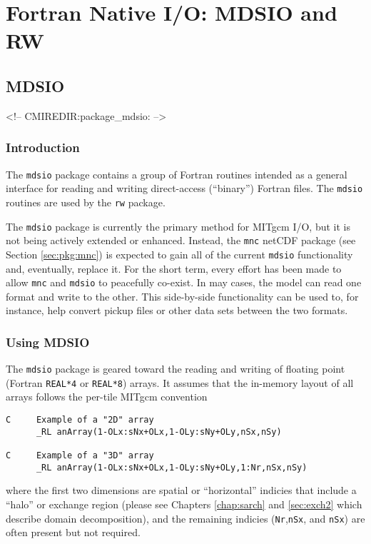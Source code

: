 

\section{Fortran Native I/O: MDSIO and RW}
\label{sec:mdsio_and_rw}


\subsection{MDSIO}
\label{sec:pkg:mdsio}
\begin{rawhtml}
<!-- CMIREDIR:package_mdsio: -->
\end{rawhtml}

\subsubsection{Introduction}
The \texttt{mdsio} package contains a group of Fortran routines
intended as a general interface for reading and writing direct-access
(``binary'') Fortran files.  The \texttt{mdsio} routines are used by
the \texttt{rw} package.

The \texttt{mdsio} package is currently the primary method for MITgcm
I/O, but it is not being actively extended or enhanced.  Instead, the
\texttt{mnc} netCDF package (see Section \ref{sec:pkg:mnc}) is
expected to gain all of the current \texttt{mdsio} functionality and,
eventually, replace it.  For the short term, every effort has been
made to allow \texttt{mnc} and \texttt{mdsio} to peacefully co-exist.
In may cases, the model can read one format and write to the other.
This side-by-side functionality can be used to, for instance, help
convert pickup files or other data sets between the two formats.


\subsubsection{Using MDSIO}
The \texttt{mdsio} package is geared toward the reading and writing of
floating point (Fortran \texttt{REAL*4} or \texttt{REAL*8}) arrays.
It assumes that the in-memory layout of all arrays follows the per-tile
MITgcm convention
\begin{verbatim}
C     Example of a "2D" array
      _RL anArray(1-OLx:sNx+OLx,1-OLy:sNy+OLy,nSx,nSy)

C     Example of a "3D" array
      _RL anArray(1-OLx:sNx+OLx,1-OLy:sNy+OLy,1:Nr,nSx,nSy)
\end{verbatim}
where the first two dimensions are spatial or ``horizontal'' indicies
that include a ``halo'' or exchange region (please see
Chapters \ref{chap:sarch} and \ref{sec:exch2} which describe domain
decomposition), and the remaining indicies (\texttt{Nr},\texttt{nSx},
and \texttt{nSx}) are often present but not required.

